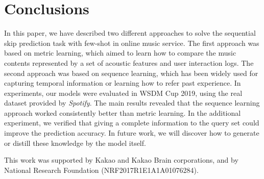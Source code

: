 \section{Conclusions}
In this paper, we have described two different approaches to solve the sequential skip prediction task with few-shot in online music service. The first approach was based on metric learning, which aimed to learn how to compare the music contents represented by a set of acoustic features and user interaction logs. The second approach was based on sequence learning, which has been widely used for capturing temporal information or learning how to refer past experience. In experiments, our models were evaluated in WSDM Cup 2019, using the real dataset provided by {\it Spotify}. The main results revealed that the sequence learning approach worked consistently better than metric learning. In the additional experiment, we verified that giving a complete information to the query set could improve the prediction accuracy. In future work, we will discover how to generate or distill these knowledge by the model itself. 

\begin{acks}
\small
This work was supported by Kakao and Kakao Brain corporations, and by  National Research Foundation (NRF2017R1E1A1A01076284).
\end{acks}

%
